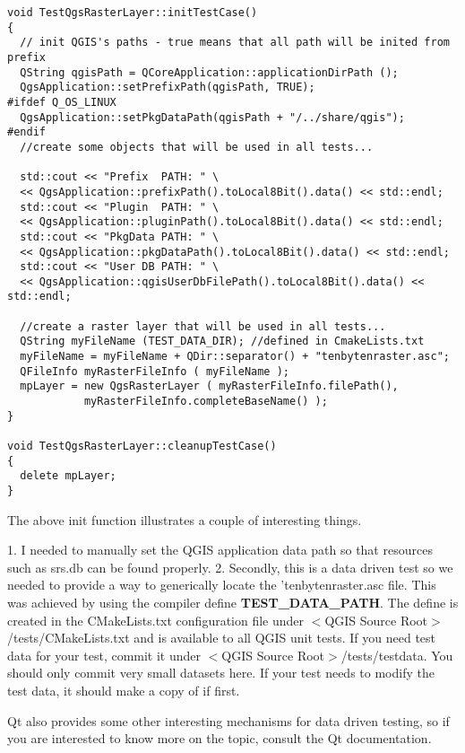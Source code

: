 \begin{verbatim}
void TestQgsRasterLayer::initTestCase()
{
  // init QGIS's paths - true means that all path will be inited from prefix
  QString qgisPath = QCoreApplication::applicationDirPath ();
  QgsApplication::setPrefixPath(qgisPath, TRUE);
#ifdef Q_OS_LINUX
  QgsApplication::setPkgDataPath(qgisPath + "/../share/qgis");
#endif
  //create some objects that will be used in all tests...

  std::cout << "Prefix  PATH: " \
  << QgsApplication::prefixPath().toLocal8Bit().data() << std::endl;
  std::cout << "Plugin  PATH: " \
  << QgsApplication::pluginPath().toLocal8Bit().data() << std::endl;
  std::cout << "PkgData PATH: " \
  << QgsApplication::pkgDataPath().toLocal8Bit().data() << std::endl;
  std::cout << "User DB PATH: " \
  << QgsApplication::qgisUserDbFilePath().toLocal8Bit().data() << std::endl;

  //create a raster layer that will be used in all tests...
  QString myFileName (TEST_DATA_DIR); //defined in CmakeLists.txt
  myFileName = myFileName + QDir::separator() + "tenbytenraster.asc";
  QFileInfo myRasterFileInfo ( myFileName );
  mpLayer = new QgsRasterLayer ( myRasterFileInfo.filePath(),
            myRasterFileInfo.completeBaseName() );
}

void TestQgsRasterLayer::cleanupTestCase()
{
  delete mpLayer;
}

\end{verbatim}

The above init function illustrates a couple of interesting things.

 1. I needed to manually set the QGIS application data path so that
   resources such as srs.db can be found properly.
 2. Secondly, this is a data driven test so we needed to provide a 
   way to generically locate the 'tenbytenraster.asc file. This was 
   achieved by using the compiler define \textbf{TEST\_DATA\_PATH}. The 
   define is created in the CMakeLists.txt configuration file under 
   $<$QGIS Source Root$>$/tests/CMakeLists.txt and is available to all 
   QGIS unit tests. If you need test data for your test, commit it 
   under $<$QGIS Source Root$>$/tests/testdata. You should only commit 
   very small datasets here. If your test needs to modify the test 
   data, it should make a copy of if first.

Qt also provides some other interesting mechanisms for data driven 
testing, so if you are interested to know more on the topic, consult 
the Qt documentation.

